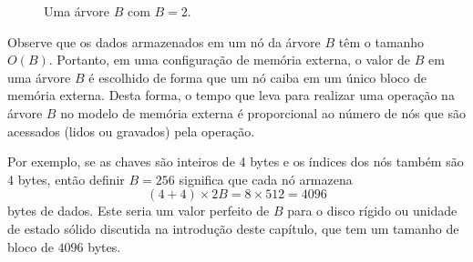 \begin{figure}
  \caption{Uma árvore $B$ com $B=2$.}
\end{figure}

Observe que os dados armazenados em um nó da árvore $B$ têm o tamanho $O(B)$. Portanto, em uma configuração de memória externa, o valor de $B$ em uma árvore $B$ é escolhido de forma que um nó caiba em um único bloco de memória externa. Desta forma, o tempo que leva para realizar uma operação na árvore $B$ no modelo de memória externa é proporcional ao número de nós que são acessados (lidos ou gravados) pela operação.

Por exemplo, se as chaves são inteiros de 4 bytes e os índices dos nós também são 4 bytes, então definir $B=256$ significa que cada nó armazena
\[
(4+4)\times 2B
 = 8\times512=4096
\]
bytes de dados. Este seria um valor perfeito de $B$ para o disco rígido ou unidade de estado sólido discutida na introdução deste capítulo, que tem um tamanho de bloco de $4096$ bytes.

